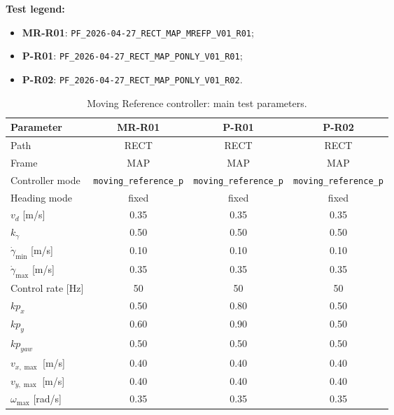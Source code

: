 \noindent
  \textbf{Test legend:}
  \begin{itemize}
      \item \textbf{MR-R01}: \texttt{PF\_2026-04-27\_RECT\_MAP\_MREFP\_V01\_R01};
      \item \textbf{P-R01}: \texttt{PF\_2026-04-27\_RECT\_MAP\_PONLY\_V01\_R01};
      \item \textbf{P-R02}: \texttt{PF\_2026-04-27\_RECT\_MAP\_PONLY\_V01\_R02}.
\end{itemize}

\begin{table}[H]
  \centering
  \caption{Moving Reference controller: main test parameters.}
  \label{tab:mref_parameters}
  \scriptsize
  \setlength{\tabcolsep}{4pt}
  \renewcommand{\arraystretch}{1.00}
  \begin{tabular}{lccc}
  \toprule
  \textbf{Parameter} &
  \textbf{MR-R01} &
  \textbf{P-R01} &
  \textbf{P-R02} \\
  \midrule
  Path & RECT & RECT & RECT \\
  Frame & MAP & MAP & MAP \\
  Controller mode & \texttt{moving\_reference\_p} & \texttt{moving\_reference\_p} & \texttt{moving\_reference\_p} \\
  Heading mode & fixed & fixed & fixed \\
  \(v_d\) [m/s] & 0.35 & 0.35 & 0.35 \\
  \(k_{\gamma}\) & 0.50 & 0.50 & 0.50 \\
  \(\dot{\gamma}_{\min}\) [m/s] & 0.10 & 0.10 & 0.10 \\
  \(\dot{\gamma}_{\max}\) [m/s] & 0.35 & 0.35 & 0.35 \\
  Control rate [Hz] & 50 & 50 & 50 \\
  \(kp_{x}\) & 0.50 & 0.80 & 0.50 \\
  \(kp_{y}\) & 0.60 & 0.90 & 0.50 \\
  \(kp_{yaw}\) & 0.50 & 0.50 & 0.50 \\
  \(v_{x,\max}\) [m/s] & 0.40 & 0.40 & 0.40 \\
  \(v_{y,\max}\) [m/s] & 0.40 & 0.40 & 0.40 \\
  \(\omega_{\max}\) [rad/s] & 0.35 & 0.35 & 0.35 \\
  \bottomrule
  \end{tabular}
\end{table}

